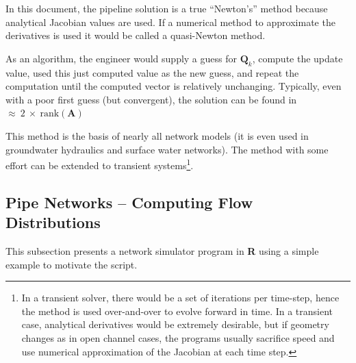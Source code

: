 In this document, the pipeline solution is a true ``Newton's'' method because analytical Jacobian values are used.  If a numerical method to approximate the derivatives is used it would be called a quasi-Newton method.

As an algorithm, the engineer would supply a guess for $\mathbf{Q}_k$, compute the update value, used this just computed value as the new guess, and repeat the computation until the computed vector is relatively unchanging.  Typically, even with a poor first guess (but convergent), the solution can be found in $\approx~2~\times~\text{rank}(\mathbf{A})$

This method is the basis of nearly all network models (it is even used in groundwater hydraulics and surface water networks).  The method with some effort can be extended to transient systems\footnote{In a transient solver, there would be a set of iterations per time-step, hence the method is used over-and-over to evolve forward in time.  In a transient case, analytical derivatives would be extremely desirable, but if geometry changes as in open channel cases, the programs usually sacrifice speed and use numerical approximation of the Jacobian at each time step.}.

\subsection{Pipe Networks -- Computing Flow Distributions}

This subsection presents a network simulator program in \textbf{R} using a simple example to motivate the script. 

